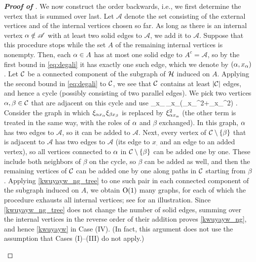 \begin{proof}[\bf Proof of ]
We now construct the order backwards, i.e., we first determine the vertex that is summed over last. Let $\mathscr A$ denote the set consisting of the external vertices and of the internal vertices chosen so far. As long as there is an internal vertex $\al\notin\mathscr A$ with at least two solid edges to $\mathscr A$, we add it to $\mathscr A$. Suppose that this procedure stops while the set $A$ of the remaining internal vertices is nonempty. Then, each $\al\in A$ has at most one solid edge to $A^c=\mathscr A$, so by the first bound in \eqref{eq:degali} it has exactly one such edge, which we denote by $(\al,x_\al)$. Let $\cal C$ be a connected component of the subgraph of $\cal H$ induced on $A$. Applying the second bound in \eqref{eq:degali} to $\cal C$, we see that $\cal C$ contains at least $|\cal C|$ edges, and hence a cycle (possibly consisting of two parallel edges). We pick two vertices $\al,\beta\in\cal C$ that are adjacent on this cycle and use
\be\label{kwuyayw_ng_tree}
\xi_{\al x_\al}\,\xi_{\beta x_\beta}\le {}\left(\xi_{\al x_\al}^2+\xi_{\beta x_\beta}^2\right) .
\ee
Consider the graph in which $\xi_{\al x_\al}\xi_{\beta x_\beta}$ is replaced by $\xi_{\al x_\al}^2$ (the other term is treated in the same way, with the roles of $\al$ and $\beta$ exchanged). In this graph, $\al$ has two edges to $\mathscr A$, so it can be added to $\mathscr A$. Next, every vertex of $\cal C\setminus\{\beta\}$ that is adjacent to $\mathscr A$ has two edges to $\mathscr A$ (its edge to $x_\cdot$ and an edge to an added vertex), so all vertices connected to $\al$ in $\cal C\setminus\{\beta\}$ can be added one by one. These include both neighbors of $\beta$ on the cycle, so $\beta$ can be added as well, and then the remaining vertices of $\cal C$ can be added one by one along paths in $\cal C$ starting from $\beta$. Applying \eqref{kwuyayw_ng_tree} to one such pair in each connected component of the subgraph induced on $A$, we obtain $\OO(1)$ many graphs, for each of which the procedure exhausts all internal vertices; see  for an illustration. Since \eqref{kwuyayw_ng_tree} does not change the number of solid edges, summing over the internal vertices in the reverse order of their addition proves \eqref{kwuyayw_ng}, and hence \eqref{kwuyayw} in Case (IV). (In fact, this argument does not use the assumption that Cases (I)--(III) do not apply.)
\begin{figure}[h]
    \centering
\end{figure}
\end{proof}
